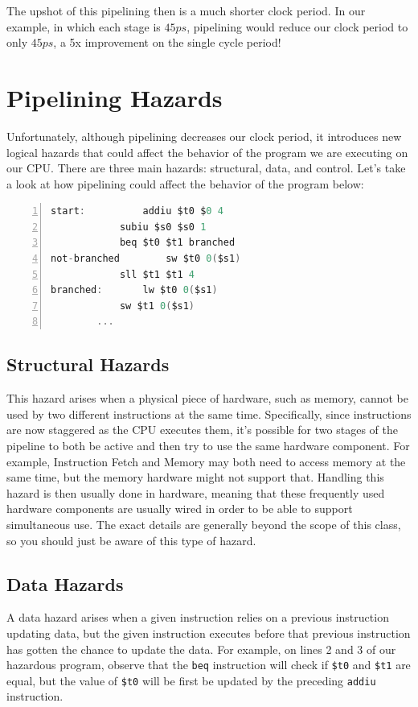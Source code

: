 \documentclass{article}
\begin{document}
The upshot of this pipelining then is a much shorter clock period. In our example, in which each stage is $45ps$, pipelining would reduce our clock period to only $45ps$, a 5x improvement on the single cycle period!

\section{Pipelining Hazards}
Unfortunately, although pipelining decreases our clock period, it introduces new logical hazards that could affect the behavior of the program we are executing on our CPU. There are three main hazards: structural, data, and control. Let's take a look at how pipelining could affect the behavior of the program below:

\begin{center}
\renewcommand{\ttdefault}{pcr}
\begin{lstlisting}[language=C, basicstyle=\ttfamily, keywordstyle=\bfseries, showstringspaces=false, morekeywords={jal, addu, sll, beq, j, sw, addiu, lw, jr, subiu}, numbers=left, stepnumber=1, firstnumber=1, numberfirstline=true]
start:			addiu $t0 $0 4
			subiu $s0 $s0 1
			beq $t0 $t1 branched
not-branched		sw $t0 0($s1)
			sll $t1 $t1 4
branched:		lw $t0 0($s1)
			sw $t1 0($s1)
		...
\end{lstlisting}
\end{center}

\subsection{Structural Hazards}
This hazard arises when a physical piece of hardware, such as memory, cannot be used by two different instructions at the same time. Specifically, since instructions are now staggered as the CPU executes them, it's possible for two stages of the pipeline to both be active and then try to use the same hardware component. For example, Instruction Fetch and Memory may both need to access memory at the same time, but the memory hardware might not support that. Handling this hazard is then usually done in hardware, meaning that these frequently used hardware components are usually wired in order to be able to support simultaneous use. The exact details are generally beyond the scope of this class, so you should just be aware of this type of hazard.

\subsection{Data Hazards}
A data hazard arises when a given instruction relies on a previous instruction updating data, but the given instruction executes before that previous instruction has gotten the chance to update the data. For example, on lines 2 and 3 of our hazardous program, observe that the \texttt{beq} instruction will check if \texttt{\$t0} and \texttt{\$t1} are equal, but the value of \texttt{\$t0} will be first be updated by the preceding \texttt{addiu} instruction. 
\end{document}
